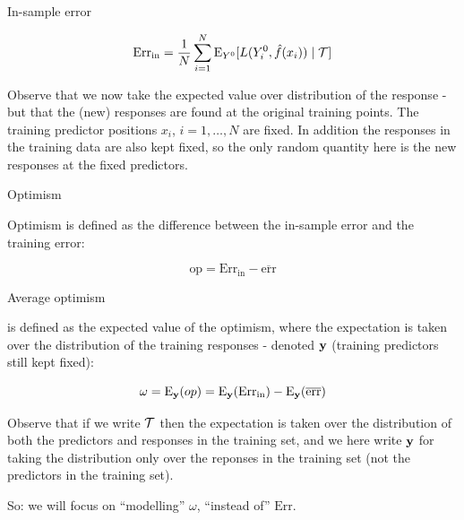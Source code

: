 \documentclass[
  ignorenonframetext,
]{beamer}
\begin{document}
\begin{frame}

\begin{block}{In-sample error}

\[\text{Err}_{\text{in}}=\frac{1}{N}\sum_{i=1}^N \text{E}_{Y^0}[L(Y_i^0,\hat{f}(x_i))\mid {\cal T}]\]

Observe that we now take the expected value over distribution of the
response - but that the (new) responses are found at the original
training points. The training predictor positions \(x_i\),
\(i=1,\ldots, N\) are fixed. In addition the responses in the training
data are also kept fixed, so the only random quantity here is the new
responses at the fixed predictors.

\end{block}

\end{frame}

\begin{frame}

\begin{block}{Optimism}

Optimism is defined as the difference between the in-sample error and
the training error:

\[ \text{op}=\text{Err}_{\text{in}}-\overline{\text{err}}\]

\end{block}

\begin{block}{Average optimism}

is defined as the expected value of the optimism, where the expectation
is taken over the distribution of the training responses - denoted
\({\bf y}\) (training predictors still kept fixed):

\[ \omega=\text{E}_{\bf y}(op)=\text{E}_{\bf y}(\text{Err}_{\text{in}})-\text{E}_{\bf y}(\overline{\text{err}})\]

Observe that if we write \({\cal T}\) then the expectation is taken over
the distribution of both the predictors and responses in the training
set, and we here write \({\bf y}\) for taking the distribution only over
the reponses in the training set (not the predictors in the training
set).

So: we will focus on ``modelling'' \(\omega\), ``instead of''
\(\text{Err}\).

\end{block}

\end{frame}
\end{document}

